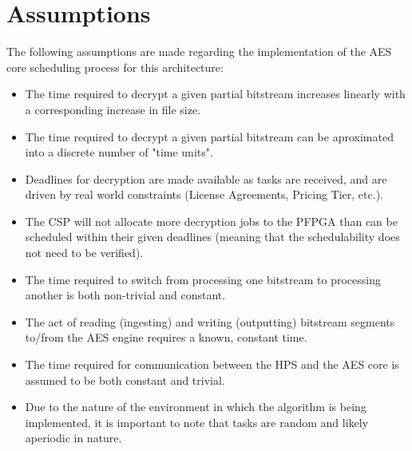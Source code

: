 \section{Assumptions}\label{sec:EDFAssumptions}
The following assumptions are made regarding the implementation of the AES core scheduling process for this architecture:
\begin{itemize}
    \item The time required to decrypt a given partial bitstream increases linearly with a corresponding increase in file size.
    \item The time required to decrypt a given partial bitstream can be aproximated into a discrete number of "time units".
    \item Deadlines for decryption are made available as tasks are received, and are driven by real world constraints (License Agreements, Pricing Tier, etc.).
    \item The CSP will not allocate more decryption jobs to the PFPGA than can be scheduled within their given deadlines (meaning that the schedulability does not need to be verified).
    \item The time required to switch from processing one bitstream to processing another is both non-trivial and constant.
    \item The act of reading (ingesting) and writing (outputting) bitstream segments to/from the AES engine requires a known, constant time.
    \item The time required for communication between the HPS and the AES core is assumed to be both constant and trivial.
    \item Due to the nature of the environment in which the algorithm is being implemented, it is important to note that tasks are random and likely aperiodic in nature.
\end{itemize}

